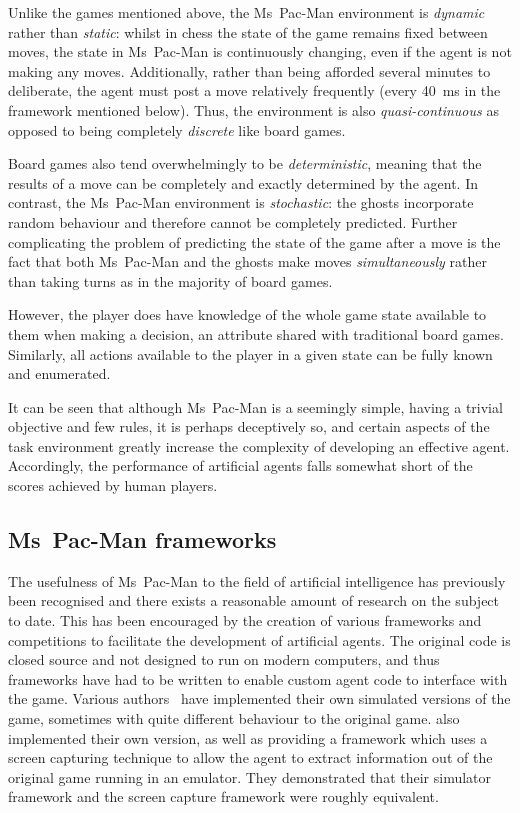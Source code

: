 Unlike the games mentioned above, the Ms~Pac-Man environment is \emph{dynamic} rather than \emph{static}: whilst in chess the state of the game remains fixed between moves, the state in Ms~Pac-Man is continuously changing, even if the agent is not making any moves.  Additionally, rather than being afforded several minutes to deliberate, the agent must post a move relatively frequently (every 40~ms in the framework mentioned below).  Thus, the environment is also \emph{quasi-continuous} as opposed to being completely \emph{discrete} like board games.

Board games also tend overwhelmingly to be \emph{deterministic}, meaning that the results of a move can be completely and exactly determined by the agent.  In contrast, the Ms~Pac-Man environment is \emph{stochastic}: the ghosts incorporate random behaviour and therefore cannot be completely predicted.  Further complicating the problem of predicting the state of the game after a move is the fact that both Ms~Pac-Man and the ghosts make moves \emph{simultaneously} rather than taking turns as in the majority of board games.

However, the player does have knowledge of the whole game state available to them when making a decision, an attribute shared with traditional board games.  Similarly, all actions available to the player in a given state can be fully known and enumerated.

It can be seen that although Ms~Pac-Man is a seemingly simple, having a trivial objective and few rules, it is perhaps deceptively so, and certain aspects of the task environment greatly increase the complexity of developing an effective agent.  Accordingly, the performance of artificial agents falls somewhat short of the scores achieved by human players.

\subsection{Ms~Pac-Man frameworks}

The usefulness of Ms~Pac-Man to the field of artificial intelligence has previously been recognised and there exists a reasonable amount of research on the subject to date.  This has been encouraged by the creation of various frameworks and competitions to facilitate the development of artificial agents.  The original code is closed source and not designed to run on modern computers, and thus frameworks have had to be written to enable custom agent code to interface with the game.  Various authors~\citep{Lucas2005,Koza1992} have implemented their own simulated versions of the game, sometimes with quite different behaviour to the original game. \citet{Robles2009} also implemented their own version, as well as providing a framework which uses a screen capturing technique to allow the agent to extract information out of the original game running in an emulator.  They demonstrated that their simulator framework and the screen capture framework were roughly equivalent.

